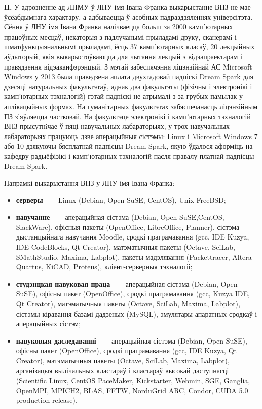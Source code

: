 \documentclass[10pt, a5paper]{article}
\begin{document}
\textbf{ІІ.} У адрозненне ад ЛНМУ ў ЛНУ імя Івана Франка выкарыстанне ВПЗ не мае ўсёабдымнага характару, а адбываецца ў асобных падраздзяленнях універсітэта. Сёння ў ЛНУ імя Івана Франка налічваецца больш за 2000 камп'ютарных працоўных месцаў, некаторыя з падлучанымі прыладамі друку, сканерамi і шматфункцыянальнымi прыладамi, ёсць 37 камп'ютарных класаў, 20 лекцыйных аўдыторый, якія выкарыстоўваюцца для чытання лекцый з відэапраектарам і правядзення відэаканфэрэнцый. З мэтай забеспячэння ліцэнзійнай АС Microsoft Windows у 2013 была праведзена аплата двухгадовай падпіскі Dream Spark для дзесяці натуральных факультэтаў, аднак два факультэты (фізічны і электронікі і камп'ютарных тэхналогій) гэтай падпіскі не атрымалі з-за грубых памылак у аплікацыйных формах. На гуманітарных факультэтах забяспечанасць ліцэнзійным ПЗ з'яўляецца частковай. На факультэце электронікі і камп'ютарных тэхналогій ВПЗ прысутнiчае ў пяці навучальных лабараторыях, у трох навучальных лабараторыях працуюць дзве аперацыйныя сістэмы: Linux і Microsoft Windows 7 або 10 дзякуючы бясплатнай падпісцы Dream Spark, якую ўдалося аформіць на кафедру радыёфізікі і камп'ютарных тэхналогій пасля правалу платнай падпісцы Dream Spark.

Напрамкі выкарыстання ВПЗ у ЛНУ імя Івана Франка:

\begin{itemize}
  \item \textbf{серверы} ~--- Linux (Debian, Open SuSE,  CentOS), Unix FreeBSD;
  \item \textbf{навучанне} ~--- аперацыйная сістэма (Debian, Open SuSE,\linebreak CentOS, SlackWare), офісныя пакеты (OpenOffice, LibreOffice, Planner), сістэма дыстанцыйнага навучання Moodle, сродкі праграмавання (gcc, IDE Kuzya, IDE CodeBlocks, Qt Creator), матэматычныя пакеты (Octave, SciLab, SMathStudio, Maxima, Labplot), пакеты мадэлявання (Packettracer, Altera Quartus, KiCAD, \linebreak Proteus), кліент-серверныя тэхналогіі;
  \item \textbf{студэнцкая навуковая праца} ~--- аперацыйная сістэма \linebreak (Debian, Open SuSE), офісны пакет (OpenOffice), сродкі праграмавання (gcc, Kuzya IDE, Qt Creator), матэматычныя пакеты (Octave, SciLab, Maxima, Labplot), сістэмы кіравання базамі дадзеных (MySQL), эмулятары апаратных сродкаў і аперацыйных сістэм;
  \item \textbf{навуковыя даследаванні} ~--- аперацыйная сістэма (Debian, Open SuSE), офісны пакет (OpenOffice), сродкі праграмавання (gcc, IDE Kuzya, Qt Creator), матэматычныя пакеты (Octave, SciLab, Maxima, Labplot), арганізацыя вылічальных кластараў і кластараў высокай даступнасці (Scientific Linux, CentOS PaceMaker, Kickstarter, Webmin, SGE, Ganglia, OpenMPI, \linebreak MPICH2, BLAS, FFTW, NorduGrid ARC, Condor, CUDA 5.0 production release).
\end{itemize}
\end{document}
